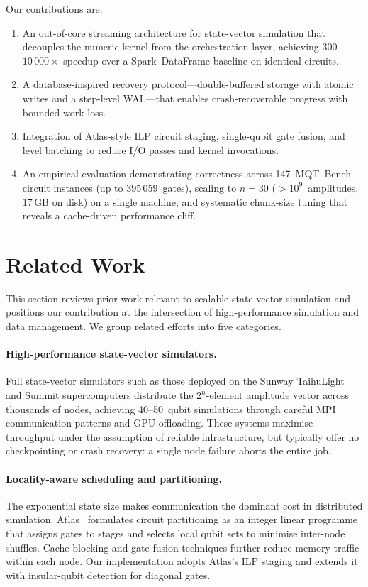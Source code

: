 Our contributions are:
\begin{enumerate}
  \item An out-of-core streaming architecture for state-vector
    simulation that decouples the numeric kernel from the
    orchestration layer, achieving $300$--$10\,000\times$ speedup
    over a Spark~DataFrame baseline on identical circuits.
  \item A database-inspired recovery protocol---double-buffered
    storage with atomic writes and a step-level WAL---that enables
    crash-recoverable progress with bounded work loss.
  \item Integration of Atlas-style ILP circuit staging, single-qubit
    gate fusion, and level batching to reduce I/O passes and kernel
    invocations.
  \item An empirical evaluation demonstrating correctness across
    147~MQT~Bench circuit instances (up to 395\,059~gates),
    scaling to $n = 30$ ($>10^9$~amplitudes, 17\,GB on disk) on a
    single machine, and systematic chunk-size tuning that reveals
    a cache-driven performance cliff.
\end{enumerate}

\section{Related Work}
\label{sec:related}

This section reviews prior work relevant to scalable state-vector
simulation and positions our contribution at the intersection of
high-performance simulation and data management. We group related
efforts into five categories.

\paragraph{High-performance state-vector simulators.}
Full state-vector simulators such as those deployed on the Sunway
TaihuLight~\cite{wang2021quantum} and Summit supercomputers
distribute the $2^n$-element amplitude vector across thousands of
nodes, achieving 40--50~qubit simulations through careful MPI
communication patterns and GPU offloading. These systems maximise
throughput under the assumption of reliable infrastructure, but
typically offer no checkpointing or crash recovery: a single node
failure aborts the entire job.

\paragraph{Locality-aware scheduling and partitioning.}
The exponential state size makes communication the dominant cost in
distributed simulation. Atlas~\cite{atlas} formulates circuit
partitioning as an integer linear programme that assigns gates to
stages and selects local qubit sets to minimise inter-node shuffles.
Cache-blocking and gate fusion techniques further reduce memory
traffic within each node. Our implementation adopts Atlas's ILP
staging and extends it with insular-qubit detection for diagonal
gates.

